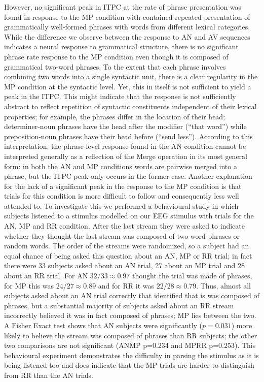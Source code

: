 \documentclass[10pt,letterpaper]{article}
\newcommand{\citet}[1]{\cite{#1}}
\begin{document}
However, no significant peak in ITPC at the rate of phrase presentation was found in response to the MP condition with contained repeated presentation of grammatically well-formed phrases with words from different lexical categories. While the difference we observe between the response to AN and AV sequences indicates a neural response to grammatical structure, there is no significant phrase rate response to the MP condition even though it is composed of grammatical two-word phrases. To the extent that each phrase involves combining two words into a single syntactic unit, there is a clear regularity in the MP condition at the syntactic level. Yet, this in itself is not sufficient to yield a peak in the ITPC. This might indicate that the response is not sufficiently abstract to reflect repetition of syntactic constituents independent of their lexical properties; for example, the phrases differ in the location of their head; determiner-noun phrases have the head after the modifier (``that word'') while preposition-noun phrases have their head before (``send less''). According to this interpretation, the phrase-level response found in the AN condition cannot be interpreted generally as a reflection of the Merge operation \citet{Chomsky1995} in its most general form: in both the AN and MP conditions words are pairwise merged into a phrase, but the ITPC peak only occurs in the former case.
\color{blue}
Another explanation for the lack of a significant peak in the response to the MP condition is that trials for this condition is more difficult to follow and consequently less well attended to. To investigate this we performed a behavioural study in which subjects listened to a stimulus modelled on our EEG stimulus with trials for the AN, MP and RR condition. After the last stream they were asked to indicate whether they thought the last stream was composed of two-word phrases or random words. The order of the streams were randomized, so a subject had an equal chance of being asked this question about an AN, MP or RR trial; in fact there were 33 subjects asked about an AN trial, 27 about an MP trial and 28 about an RR trial. For AN $32/33\approx 0.97$ thought the trial was made of phrases, for MP this was $24/27\approx 0.89$ and for RR it was $22/28\approx 0.79$. Thus, almost all subjects asked about an AN trial correctly that identified that is was composed of phrases, but a substantial majority of subjects asked about an RR stream incorrectly believed it was in fact composed of phrases; MP lies between the two. A Fisher Exact test shows that AN subjects were significantly ($p=0.031$) more likely to believe the stream was composed of phrases than RR subjects; the other two comparisons are not significant (AN\>MP p=0.234 and MP\>RR p=0.253). This behavioural experiment demonstrates the difficulty in parsing the stimulus as it is being listened too and does indicate that the MP trials are harder to distinguish from RR than the AN trials.
\color{black}
\end{document}
